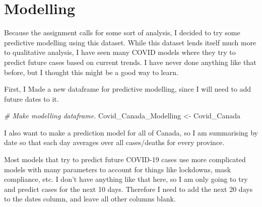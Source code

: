 \documentclass[]{tufte-handout}
\newenvironment{Shaded}{}{}
\newcommand{\CommentTok}[1]{\textcolor[rgb]{0.38,0.63,0.69}{\textit{#1}}}
\newcommand{\DataTypeTok}[1]{\textcolor[rgb]{0.56,0.13,0.00}{#1}}
\newcommand{\KeywordTok}[1]{\textcolor[rgb]{0.00,0.44,0.13}{\textbf{#1}}}
\newcommand{\NormalTok}[1]{#1}
\newcommand{\OperatorTok}[1]{\textcolor[rgb]{0.40,0.40,0.40}{#1}}
\newcommand{\StringTok}[1]{\textcolor[rgb]{0.25,0.44,0.63}{#1}}
\begin{document}
\hypertarget{modelling}{%
\section{Modelling}\label{modelling}}

Because the assignment calls for some sort of analysis, I decided to try
some predictive modelling using this dataset. While this dataset lends
itself much more to qualitative analysis, I have seen many COVID models
where they try to predict future cases based on current trends. I have
never done anything like that before, but I thought this might be a good
way to learn.

First, I Made a new dataframe for predictive modelling, since I will
need to add future dates to it.

\begin{Shaded}
\begin{Highlighting}[]
\CommentTok{# Make modelling dataframe.}
\NormalTok{Covid_Canada_Modelling <-}\StringTok{ }\NormalTok{Covid_Canada}
\end{Highlighting}
\end{Shaded}

I also want to make a prediction model for all of Canada, so I am
summarising by date so that each day averages over all cases/deaths for
every province.

\begin{Shaded}
\end{Shaded}

Most models that try to predict future COVID-19 cases use more
complicated models with many parameters to account for things like
lockdowns, mask compliance, etc. I don't have anything like that here,
so I am only going to try and predict cases for the next 10 days.
Therefore I need to add the next 20 days to the dates column, and leave
all other columns blank.
\end{document}
